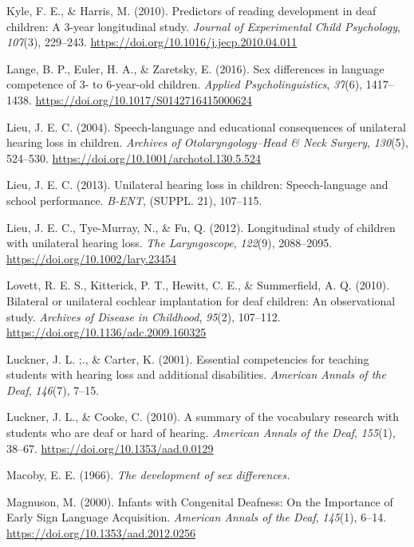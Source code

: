 \documentclass[english,man]{apa6}
\begin{document}
\leavevmode\hypertarget{ref-kyle2010}{}%
Kyle, F. E., \& Harris, M. (2010). Predictors of reading development in deaf children: A 3-year longitudinal study. \emph{Journal of Experimental Child Psychology}, \emph{107}(3), 229--243. \url{https://doi.org/10.1016/j.jecp.2010.04.011}

\leavevmode\hypertarget{ref-lange2016}{}%
Lange, B. P., Euler, H. A., \& Zaretsky, E. (2016). Sex differences in language competence of 3- to 6-year-old children. \emph{Applied Psycholinguistics}, \emph{37}(6), 1417--1438. \url{https://doi.org/10.1017/S0142716415000624}

\leavevmode\hypertarget{ref-lieu2004}{}%
Lieu, J. E. C. (2004). Speech-language and educational consequences of unilateral hearing loss in children. \emph{Archives of Otolaryngology--Head \& Neck Surgery}, \emph{130}(5), 524--530. \url{https://doi.org/10.1001/archotol.130.5.524}

\leavevmode\hypertarget{ref-lieu2013}{}%
Lieu, J. E. C. (2013). Unilateral hearing loss in children: Speech-language and school performance. \emph{B-ENT}, (SUPPL. 21), 107--115.

\leavevmode\hypertarget{ref-lieu2012}{}%
Lieu, J. E. C., Tye-Murray, N., \& Fu, Q. (2012). Longitudinal study of children with unilateral hearing loss. \emph{The Laryngoscope}, \emph{122}(9), 2088--2095. \url{https://doi.org/10.1002/lary.23454}

\leavevmode\hypertarget{ref-lovett2010}{}%
Lovett, R. E. S., Kitterick, P. T., Hewitt, C. E., \& Summerfield, A. Q. (2010). Bilateral or unilateral cochlear implantation for deaf children: An observational study. \emph{Archives of Disease in Childhood}, \emph{95}(2), 107--112. \url{https://doi.org/10.1136/adc.2009.160325}

\leavevmode\hypertarget{ref-luckner2001}{}%
Luckner, J. L. ;., \& Carter, K. (2001). Essential competencies for teaching students with hearing loss and additional disabilities. \emph{American Annals of the Deaf}, \emph{146}(7), 7--15.

\leavevmode\hypertarget{ref-luckner2010}{}%
Luckner, J. L., \& Cooke, C. (2010). A summary of the vocabulary research with students who are deaf or hard of hearing. \emph{American Annals of the Deaf}, \emph{155}(1), 38--67. \url{https://doi.org/10.1353/aad.0.0129}

\leavevmode\hypertarget{ref-macoby1966}{}%
Macoby, E. E. (1966). \emph{The development of sex differences.}

\leavevmode\hypertarget{ref-magnuson2000}{}%
Magnuson, M. (2000). Infants with Congenital Deafness: On the Importance of Early Sign Language Acquisition. \emph{American Annals of the Deaf}, \emph{145}(1), 6--14. \url{https://doi.org/10.1353/aad.2012.0256}
\end{document}
